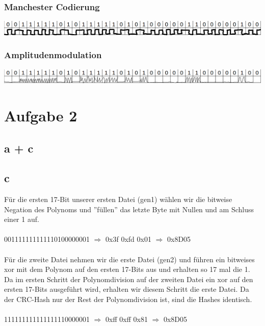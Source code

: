 \documentclass[numbers=noendperiod]{scrartcl}
\begin{document}
\subsubsection*{Manchester Codierung}
\includegraphics[width=1.0\textwidth]{manchester.png}
\subsubsection*{Amplitudenmodulation}
\includegraphics[width=1.0\textwidth]{amplitude.png}
\section*{Aufgabe 2}

\subsection*{a + c}


\subsection*{c}
Für die ersten 17-Bit unserer ersten Datei (gen1) wählen wir die bitweise Negation des Polynoms und ''füllen'' das letzte Byte mit Nullen und am Schluss einer 1 auf. \\ \\

001111111111110100000001 \(\Rightarrow \) 0x3f 0xfd 0x01 \(\Rightarrow \) 0x8D05 \\ \\
Für die zweite Datei nehmen wir die erste Datei (gen2) und führen ein bitweises xor mit dem Polynom auf den ersten 17-Bits aus und erhalten so 17 mal die 1. Da im ersten Schritt der Polynomdivision auf der zweiten Datei ein xor auf den ersten 17-Bits ausgeführt wird, erhalten wir diesem Schritt die erste Datei. Da der CRC-Hash nur der Rest der Polynomdivision ist, sind die Hashes identisch.\\ \\

111111111111111110000001 \(\Rightarrow \) 0xff 0xff 0x81 \(\Rightarrow \) 0x8D05 \\ \\
\end{document}
